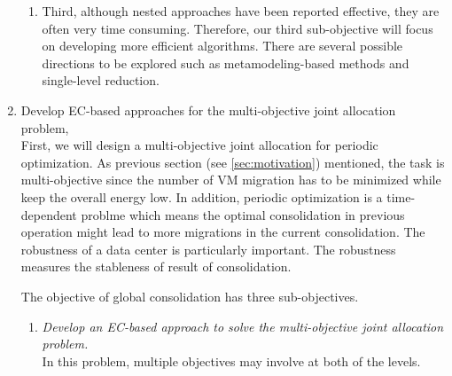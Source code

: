 \begin{enumerate}
\begin{enumerate}
		\item Third, although nested approaches have been reported effective, they are often very time consuming. Therefore, our third sub-objective will focus on developing more efficient algorithms. There are several possible directions to be explored such as metamodeling-based methods \cite{Wang:2007em} and single-level reduction.
	\end{enumerate}

	\item Develop EC-based approaches for the multi-objective joint allocation problem, \\
	First, we will design a multi-objective joint allocation for periodic optimization. As previous section (see \ref{sec:motivation}) mentioned, the task is multi-objective since the number of VM migration has to be minimized while keep the overall energy low. In addition, periodic optimization is a time-dependent problme which means the optimal consolidation in previous operation might lead to more migrations in the current consolidation. The robustness of a data center is particularly important. The robustness measures the stableness of result of consolidation.

	The objective of global consolidation has three sub-objectives.



	\begin{enumerate}
		\item \emph{Develop an EC-based approach to solve the multi-objective joint allocation problem.} \\
		In this problem, multiple objectives may involve at both of the levels.



\end{enumerate}
\end{enumerate}
